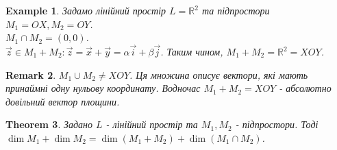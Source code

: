 \documentclass[a4paper, 10pt]{article}
\theoremstyle{theoremdd}
\newtheorem{theorem}{Theorem}[subsection]
\theoremstyle{theoremdd}
\theoremstyle{theoremdd}
\theoremstyle{theoremdd}
\newtheorem{example}[theorem]{Example}
\theoremstyle{theoremdd}
\theoremstyle{theoremdd}
\newtheorem{remark}[theorem]{Remark}
\theoremstyle{theoremdd}
\theoremstyle{theoremdd}
\begin{document}
	\begin{example}
	Задамо лінійний простір $L=\mathbb{R}^2$ та підпростори $M_1 = OX, M_2 = OY$.\\
	$M_1 \cap M_2 = (0,0)$.\\
	$\vec{z} \in M_1 + M_2: \vec{z} = \vec{x} + \vec{y} = \alpha \vec{i} + \beta \vec{j}$. Таким чином, $M_1 + M_2 = \mathbb{R}^2 = XOY$.
	\end{example}
	
	\begin{remark}
	$M_1 \cup M_2 \neq XOY$. Ця множина описує вектори, які мають принаймні одну нульову координату. Водночас $M_1 + M_2 = XOY$ - абсолютно довільний вектор площини.
	\end{remark}
	
	\begin{theorem}
	Задано $L$ - лінійний простір та $M_1,M_2$ - підпростори. Тоді\\
	$\dim{M_1} + \dim{M_2} = \dim(M_1 + M_2) + \dim(M_1 \cap M_2)$.
	\end{theorem}
	
\end{document}
